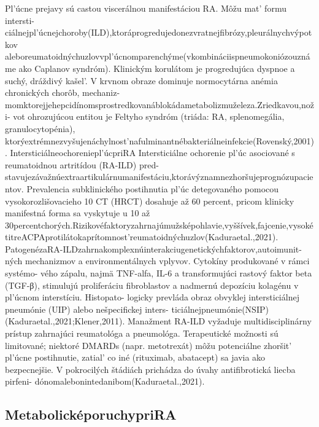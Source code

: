 Pl’úcne prejavy sú castou viscerálnou manifestáciou RA. Môžu mat’ formu intersti- ciálnejpl’úcnejchoroby(ILD),ktoráprogredujedonezvratnejfibrózy,pleurálnychvýpotkov aleboreumatoidnýchuzlovvpl’úcnomparenchýme(vkombináciispneumokoniózouznáme ako Caplanov syndróm). Klinickým korulátom je progredujúca dyspnoe a suchý, dráždivý kašel’. V krvnom obraze dominuje normocytárna anémia chronických chorôb, mechaniz- momktorejjehepcidínomsprostredkovanáblokádametabolizmuželeza.Zriedkavou,noži- vot ohrozujúcou entitou je Feltyho syndróm (triáda: RA, splenomegália, granulocytopénia), ktorýextrémnezvyšujenáchylnost’nafulminantnébakteriálneinfekcie(Rovenský,2001). Intersticiálneochoreniepl’úcpriRA Intersticiálne ochorenie pl’úc asociované s reumatoidnou artritídou (RA-ILD) pred- stavujezávažnúextraartikulárnumanifestáciu,ktorávýznamnezhoršujeprognózupacientov. Prevalencia subklinického postihnutia pl’úc detegovaného pomocou vysokorozlišovacieho 10 CT (HRCT) dosahuje až 60 percent, pricom klinicky manifestná forma sa vyskytuje u 10 až 30percentchorých.Rizikovéfaktoryzahrnajúmužsképohlavie,vyššívek,fajcenie,vysoké titreACPAprotilátokaprítomnost’reumatoidnýchuzlov(Kaduraetal.,2021). PatogenézaRA-ILDzahrnakomplexnúinterakciugenetickýchfaktorov,autoimunit- ných mechanizmov a environmentálnych vplyvov. Cytokíny produkované v rámci systémo- vého zápalu, najmä TNF-alfa, IL-6 a transformujúci rastový faktor beta (TGF-β), stimulujú proliferáciu fibroblastov a nadmernú depozíciu kolagénu v pl’úcnom interstíciu. Histopato- logicky prevláda obraz obvyklej intersticiálnej pneumónie (UIP) alebo nešpecifickej inters- ticiálnejpneumónie(NSIP)(Kaduraetal.,2021;Klener,2011). Manažment RA-ILD vyžaduje multidisciplinárny prístup zahrnajúci reumatológa a pneumológa. Terapeutické možnosti sú limitované; niektoré DMARDs (napr. metotrexát) môžu potenciálne zhoršit’ pl’úcne postihnutie, zatial’ co iné (rituximab, abatacept) sa javia ako bezpecnejšie. V pokrocilých štádiách prichádza do úvahy antifibrotická liecba pirfeni- dónomalebonintedanibom(Kaduraetal.,2021).


\subsection{MetabolicképoruchypriRA}

